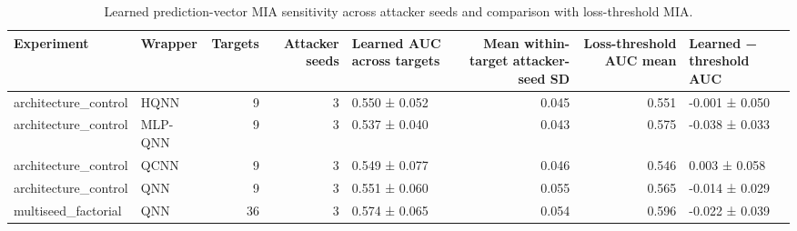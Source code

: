 \begin{table}[t]
\caption{Learned prediction-vector MIA sensitivity across attacker seeds and comparison with loss-threshold MIA.}
\label{tab:learned-mia-robustness}
\begin{tabular}{llrrlrrl}
\toprule
Experiment & Wrapper & Targets & Attacker seeds & Learned AUC across targets & Mean within-target attacker-seed SD & Loss-threshold AUC mean & Learned − threshold AUC \\
\midrule
architecture\_control & HQNN & 9 & 3 & 0.550 ± 0.052 & 0.045 & 0.551 & -0.001 ± 0.050 \\
architecture\_control & MLP-QNN & 9 & 3 & 0.537 ± 0.040 & 0.043 & 0.575 & -0.038 ± 0.033 \\
architecture\_control & QCNN & 9 & 3 & 0.549 ± 0.077 & 0.046 & 0.546 & 0.003 ± 0.058 \\
architecture\_control & QNN & 9 & 3 & 0.551 ± 0.060 & 0.055 & 0.565 & -0.014 ± 0.029 \\
multiseed\_factorial & QNN & 36 & 3 & 0.574 ± 0.065 & 0.054 & 0.596 & -0.022 ± 0.039 \\
\bottomrule
\end{tabular}
\end{table}
